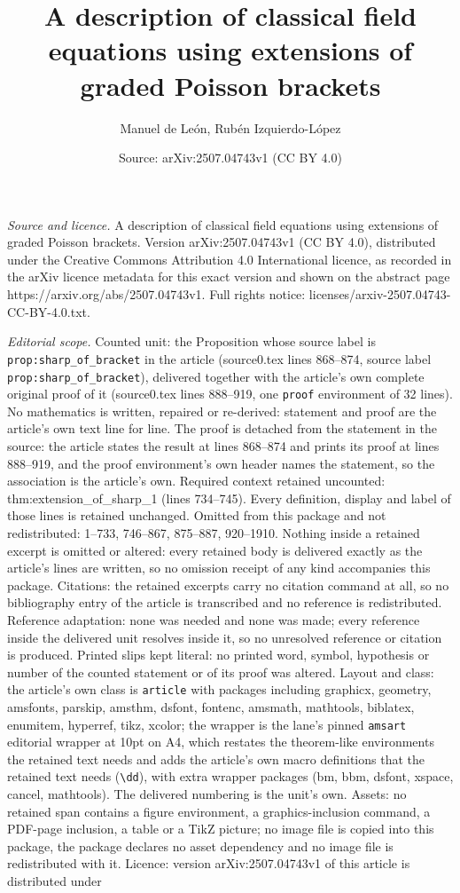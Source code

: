 \documentclass[10pt,a4paper]{amsart}
\title[A description of classical field equations using extensions ]{A description of classical field equations using extensions of graded Poisson brackets}
\author{Manuel de Le\'on, Rub\'en Izquierdo-L\'opez}
\date{Source: arXiv:2507.04743v1 (CC BY 4.0)}
\begin{document}
\maketitle

\noindent\emph{Source and licence.} A description of classical field equations using extensions of graded Poisson brackets. Version arXiv:2507.04743v1 (CC BY 4.0), distributed under the Creative Commons Attribution 4.0 International licence, as recorded in the arXiv licence metadata for this exact version and shown on the abstract page https://arxiv.org/abs/2507.04743v1. Full rights notice: licenses/arxiv-2507.04743-CC-BY-4.0.txt.\par\smallskip

\noindent\textit{Editorial scope.} Counted unit: the Proposition whose source label is \texttt{prop:sharp\_of\_bracket} in the article (source0.tex lines 868--874, source label \texttt{prop:sharp\_of\_bracket}), delivered together with the article's own complete original proof of it (source0.tex lines 888--919, one \texttt{proof} environment of 32 lines). No mathematics is written, repaired or re-derived: statement and proof are the article's own text line for line. The proof is detached from the statement in the source: the article states the result at lines 868--874 and prints its proof at lines 888--919, and the proof environment's own header names the statement, so the association is the article's own. Required context retained uncounted: thm:extension\_of\_sharp\_1 (lines 734--745). Every definition, display and label of those lines is retained unchanged. Omitted from this package and not redistributed: 1--733, 746--867, 875--887, 920--1910. Nothing inside a retained excerpt is omitted or altered: every retained body is delivered exactly as the article's lines are written, so no omission receipt of any kind accompanies this package. Citations: the retained excerpts carry no citation command at all, so no bibliography entry of the article is transcribed and no reference is redistributed. Reference adaptation: none was needed and none was made; every reference inside the delivered unit resolves inside it, so no unresolved reference or citation is produced. Printed slips kept literal: no printed word, symbol, hypothesis or number of the counted statement or of its proof was altered. Layout and class: the article's own class is \texttt{article} with packages including graphicx, geometry, amsfonts, parskip, amsthm, dsfont, fontenc, amsmath, mathtools, biblatex, enumitem, hyperref, tikz, xcolor; the wrapper is the lane's pinned \texttt{amsart} editorial wrapper at 10pt on A4, which restates the theorem-like environments the retained text needs and adds the article's own macro definitions that the retained text needs (\texttt{\textbackslash dd}), with extra wrapper packages (bm, bbm, dsfont, xspace, cancel, mathtools). The delivered numbering is the unit's own. Assets: no retained span contains a figure environment, a graphics-inclusion command, a PDF-page inclusion, a table or a TikZ picture; no image file is copied into this package, the package declares no asset dependency and no image file is redistributed with it. Licence: version arXiv:2507.04743v1 of this article is distributed under 
\end{document}
